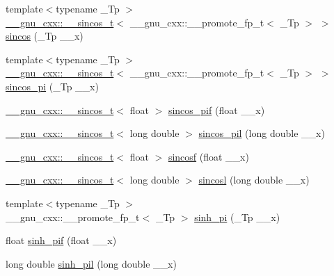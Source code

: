 \begin{DoxyCompactItemize}
\item 
{\footnotesize template$<$typename \+\_\+\+Tp $>$ }\\\hyperlink{struct____gnu__cxx_1_1____sincos__t}{\+\_\+\+\_\+gnu\+\_\+cxx\+::\+\_\+\+\_\+sincos\+\_\+t}$<$ \+\_\+\+\_\+gnu\+\_\+cxx\+::\+\_\+\+\_\+promote\+\_\+fp\+\_\+t$<$ \+\_\+\+Tp $>$ $>$ \hyperlink{group__gnu__math__spec__func_ga055df322391de7d0450f58b2e73b6171}{sincos} (\+\_\+\+Tp \+\_\+\+\_\+x)
\item 
{\footnotesize template$<$typename \+\_\+\+Tp $>$ }\\\hyperlink{struct____gnu__cxx_1_1____sincos__t}{\+\_\+\+\_\+gnu\+\_\+cxx\+::\+\_\+\+\_\+sincos\+\_\+t}$<$ \+\_\+\+\_\+gnu\+\_\+cxx\+::\+\_\+\+\_\+promote\+\_\+fp\+\_\+t$<$ \+\_\+\+Tp $>$ $>$ \hyperlink{group__gnu__math__spec__func_ga011b1b2431b5f0467f7e3688b14628c6}{sincos\+\_\+pi} (\+\_\+\+Tp \+\_\+\+\_\+x)
\item 
\hyperlink{struct____gnu__cxx_1_1____sincos__t}{\+\_\+\+\_\+gnu\+\_\+cxx\+::\+\_\+\+\_\+sincos\+\_\+t}$<$ float $>$ \hyperlink{group__gnu__math__spec__func_gacf416c867a8a456f8f0e3d8b45ca8bd5}{sincos\+\_\+pif} (float \+\_\+\+\_\+x)
\item 
\hyperlink{struct____gnu__cxx_1_1____sincos__t}{\+\_\+\+\_\+gnu\+\_\+cxx\+::\+\_\+\+\_\+sincos\+\_\+t}$<$ long double $>$ \hyperlink{group__gnu__math__spec__func_ga1f1efc07313a3de1e994d89c3b83b957}{sincos\+\_\+pil} (long double \+\_\+\+\_\+x)
\item 
\hyperlink{struct____gnu__cxx_1_1____sincos__t}{\+\_\+\+\_\+gnu\+\_\+cxx\+::\+\_\+\+\_\+sincos\+\_\+t}$<$ float $>$ \hyperlink{group__gnu__math__spec__func_ga3929d13e38535418cd24db5cee80660c}{sincosf} (float \+\_\+\+\_\+x)
\item 
\hyperlink{struct____gnu__cxx_1_1____sincos__t}{\+\_\+\+\_\+gnu\+\_\+cxx\+::\+\_\+\+\_\+sincos\+\_\+t}$<$ long double $>$ \hyperlink{group__gnu__math__spec__func_ga96a7222e47d430a228973658ca9f6f35}{sincosl} (long double \+\_\+\+\_\+x)
\item 
{\footnotesize template$<$typename \+\_\+\+Tp $>$ }\\\+\_\+\+\_\+gnu\+\_\+cxx\+::\+\_\+\+\_\+promote\+\_\+fp\+\_\+t$<$ \+\_\+\+Tp $>$ \hyperlink{group__gnu__math__spec__func_gab004f7356231c96ae819d72e5d75b8dd}{sinh\+\_\+pi} (\+\_\+\+Tp \+\_\+\+\_\+x)
\item 
float \hyperlink{group__gnu__math__spec__func_ga74103f57ab0d97126732f3cb276c5ab3}{sinh\+\_\+pif} (float \+\_\+\+\_\+x)
\item 
long double \hyperlink{group__gnu__math__spec__func_ga2232ee554ef2a902824db42e2e09c483}{sinh\+\_\+pil} (long double \+\_\+\+\_\+x)

\end{DoxyCompactItemize}
